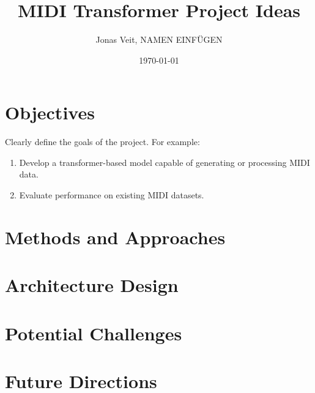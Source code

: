 \documentclass[a4paper,11pt]{article}
\title{MIDI Transformer Project Ideas}
\author{Jonas Veit, NAMEN EINFÜGEN }
\date{\today}
\begin{document}
\maketitle

\section*{Objectives}
Clearly define the goals of the project. For example:
\begin{enumerate}
    \item Develop a transformer-based model capable of generating or processing MIDI data.
    \item Evaluate performance on existing MIDI datasets.
\end{enumerate}

\section*{Methods and Approaches}

\section*{Architecture Design}


\section*{Potential Challenges}


\section*{Future Directions}
\end{document}
